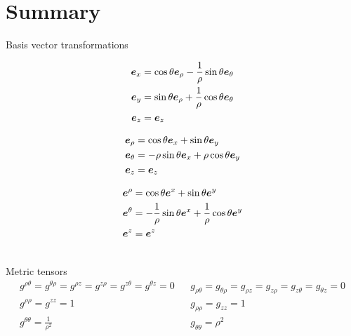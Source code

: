 \section{Summary}
\label{app:cylSummary}
%
Basis vector transformations\\
%
\begin{minipage}{0.3\textwidth}
\begin{align*}
    \ve{e}_x
    &=
    \cos\theta \ve{e}_\rho
    - \frac{1}{\rho} \sin\theta \ve{e}_\theta
    \\
%
%
    \ve{e}_y
    &=
    \sin\theta \ve{e}_\rho
    + \frac{1}{\rho} \cos\theta \ve{e}_\theta
    \\
%
%
    \ve{e}_z &= \ve{e}_z
\end{align*}
\end{minipage}
%
\hfill
%
\begin{minipage}{0.3\textwidth}
    \begin{align*}
        \boldsymbol{e}_\rho
        &=
        \cos\theta \boldsymbol{e}_x
        + \sin\theta \boldsymbol{e}_y
        \\
        \boldsymbol{e}_\theta
        &=
        -\rho\sin\theta \boldsymbol{e}_x
        + \rho\cos\theta \boldsymbol{e}_y
        \\
        \boldsymbol{e}_z &= \boldsymbol{e}_z
    \end{align*}
\end{minipage}
%
\hfill
%
\begin{minipage}{0.3\textwidth}
    \begin{align*}
        \boldsymbol{e}^\rho
        &=
        \cos\theta \boldsymbol{e}^x
        + \sin\theta \boldsymbol{e}^y
        \\
        \boldsymbol{e}^\theta
        &=
        -\frac{1}{\rho}\sin\theta \boldsymbol{e}^x
        + \frac{1}{\rho} \cos\theta \boldsymbol{e}^y
        \\
        \boldsymbol{e}^z &= \boldsymbol{e}^z
    \end{align*}
\end{minipage}
\\
%
Metric tensors
%
\begin{align*}
    &
    g^{\rho\theta} = g^{\theta\rho}
    = g^{\rho z} = g^{z \rho}
    = g^{z\theta} = g^{\theta z}
    = 0
    &
    &
    g_{\rho\theta} = g_{\theta\rho}
    = g_{\rho z} = g_{z \rho}
    = g_{z\theta} = g_{\theta z}
    = 0
    &
    \\
    &
    g^{\rho\rho} = g^{z z} = 1
    &
    &
    g_{\rho\rho} = g_{z z} = 1
    &
    \\
    &
    g^{\theta\theta} = \frac{1}{\rho^2}
    &
    &
    g_{\theta\theta} = \rho^2
    &
\end{align*}
